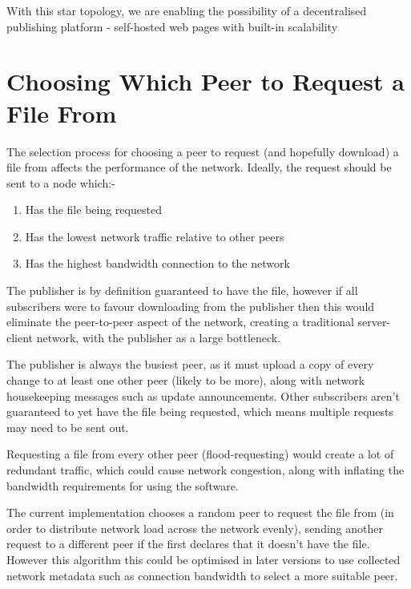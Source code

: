 \documentclass[12pt,a4paper,]{adreport}
\begin{document}
With this star topology, we are enabling the possibility of a
decentralised publishing platform - self-hosted web pages with built-in
scalability

\section{Choosing Which Peer to Request a File
From}\label{choosing-which-peer-to-request-a-file-from}

The selection process for choosing a peer to request (and hopefully
download) a file from affects the performance of the network. Ideally,
the request should be sent to a node which:-

\begin{enumerate}
\def\labelenumi{\arabic{enumi}.}
\itemsep1pt\parskip0pt
\item
  Has the file being requested
\item
  Has the lowest network traffic relative to other peers
\item
  Has the highest bandwidth connection to the network
\end{enumerate}

The publisher is by definition guaranteed to have the file, however if
all subscribers were to favour downloading from the publisher then this
would eliminate the peer-to-peer aspect of the network, creating a
traditional server-client network, with the publisher as a large
bottleneck.

The publisher is always the busiest peer, as it must upload a copy of
every change to at least one other peer (likely to be more), along with
network housekeeping messages such as update announcements. Other
subscribers aren't guaranteed to yet have the file being requested,
which means multiple requests may need to be sent out.

Requesting a file from every other peer (flood-requesting) would create
a lot of redundant traffic, which could cause network congestion, along
with inflating the bandwidth requirements for using the software.

The current implementation chooses a random peer to request the file
from (in order to distribute network load across the network evenly),
sending another request to a different peer if the first declares that
it doesn't have the file. However this algorithm this could be optimised
in later versions to use collected network metadata such as connection
bandwidth to select a more suitable peer.
\end{document}
